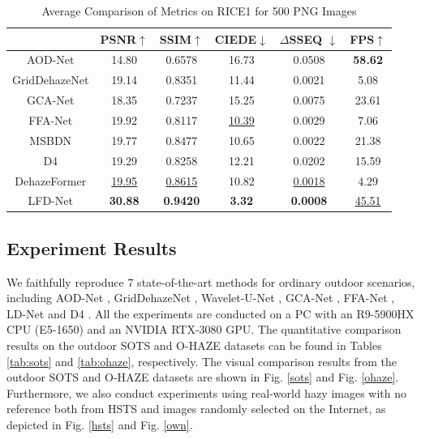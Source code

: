 \documentclass[lettersize,journal]{IEEEtran}
\begin{document}
\begin{table}[p!th]
    \caption{Average Comparison of Metrics on RICE1 for 500 PNG Images\label{tab:rice}}
    \centering
    \begin{tabular}{cccccc}
    \hline
    &PSNR$\uparrow$ & SSIM$\uparrow$ & CIEDE$\downarrow$ & $\Delta$SSEQ $\downarrow$ & FPS$\uparrow$ \\
    \hline
    AOD-Net       & 14.80 & 0.6578 & 16.73 & 0.0508 & \textbf{58.62} \\
    GridDehazeNet & 19.14 & 0.8351 & 11.44 & 0.0021 & 5.08 \\
    GCA-Net       & 18.35 & 0.7237 & 15.25 & 0.0075 & 23.61 \\    
    FFA-Net       & 19.92 & 0.8117 & \underline{10.39} & 0.0029 & 7.06 \\
    MSBDN         & 19.77 & 0.8477 & 10.65 & 0.0022 & 21.38 \\ %
    D4            & 19.29 & 0.8258 & 12.21 & 0.0202 & 15.59\\
    DehazeFormer  & \underline{19.95} & \underline{0.8615} & 10.82 & \underline{0.0018} & 4.29 \\ %
    LFD-Net       & \textbf{30.88} & \textbf{0.9420} & \textbf{3.32} & \textbf{0.0008} & \underline{45.51} \\
    \hline
    \end{tabular}
\end{table}

\subsection{Experiment Results}
We faithfully reproduce 7 state-of-the-art methods for ordinary outdoor scenarios, including AOD-Net \cite{li2017aod}, GridDehazeNet \cite{liu2019griddehazenet}, Wavelet-U-Net \cite{yang2019wavelet}, GCA-Net \cite{chen2019gated}, FFA-Net \cite{qin2020ffa}, LD-Net 
\cite{ullah2021light} and D4 \cite{yang2022d4}. All the experiments are conducted on a PC with an R9-5900HX CPU (E5-1650) and an NVIDIA RTX-3080 GPU. The quantitative comparison results on the outdoor SOTS and O-HAZE datasets can be found in Tables \ref{tab:sots} and \ref{tab:ohaze}, respectively. The visual comparison results from the outdoor SOTS and O-HAZE datasets are shown in Fig. \ref{sots} and Fig. \ref{ohaze}. Furthermore, we also conduct experiments using real-world hazy images with no reference both from HSTS and images randomly selected on the Internet, as depicted in Fig. \ref{hsts} and Fig. \ref{own}. 
\end{document}
